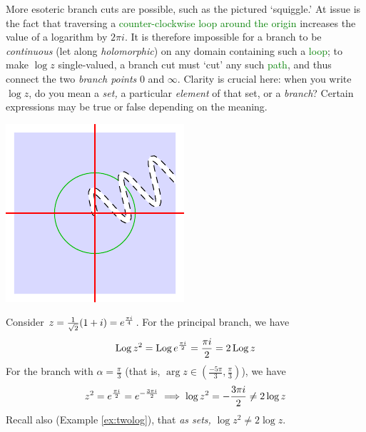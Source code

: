 
\goodbreak

\begin{minipage}[t]{0.72\linewidth}\vspace{0pt}
	More esoteric branch cuts are possible, such as the pictured `squiggle.' At issue is the fact that traversing a \textcolor{Green}{counter-clockwise loop around the origin} increases the value of a logarithm  by $2\pi i$. It is therefore impossible for a branch to be \emph{continuous} (let along \emph{holomorphic}) on any domain containing such a \textcolor{Green}{loop}; to make $\log z$ single-valued, a branch cut must `cut' any such \textcolor{Green}{path}, and thus connect the two \emph{branch points} 0 and $\infty$.\smallbreak
	Clarity is crucial here: when you write $\log z$, do you mean a \emph{set,} a particular \emph{element} of that set, or a \emph{branch}? Certain expressions may be true or false depending on the meaning.
\end{minipage}
\hfill
\begin{minipage}[t]{0.27\linewidth}\vspace{0pt}
	\flushright\includegraphics{branch3}
\end{minipage}



\begin{example}{}{}
	Consider $z=\frac 1{\sqrt 2}(1+i)=e^{\frac{\pi i}{4}}$. For the principal branch, we have
	\[
		\operatorname{Log} z^2=\operatorname{Log} e^{\frac{\pi i}{2}} =\frac{\pi i}2 =2\operatorname{Log} z
	\]
	For the branch with $\alpha=\frac{\pi}3$ (that is, $\arg z\in(\frac{-5\pi}3,\frac{\pi}3)$), we have
	\[
		z^2=e^{\frac{\pi i}{2}}=e^{-\frac{3\pi i}{2}}\implies \log z^2=-\frac{3\pi i}2 \neq 2\log z
	\]
	Recall also (Example \ref{ex:twolog}), that \emph{as sets,} $\log z^2\neq 2\log z$. 
\end{example}

